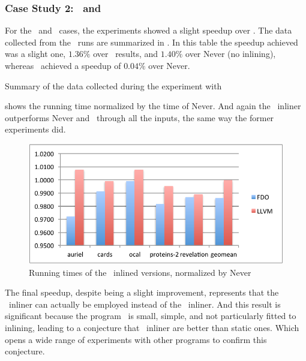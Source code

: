 \subsubsection{Case Study 2: \bzip\  and \gzip}

For the \bzip\ and \gzip\ cases, the experiments showed a slight speedup over \llvm. The data collected from the \bzip\ runs are summarized in . In this table the speedup achieved was a slight one, $1.36 \%$ over \llvm\ results, and $1.40 \%$ over Never (no inlining), whereas \llvm\ achieved a speedup of $0.04 \%$ over Never.

\begin{table}
  \centering
  \begin{tiny}
  
  \end{tiny}
  \caption{Summary of the data collected during the experiment with \bzip}
  \label{tab:speedupb}
\end{table}

 shows the running time normalized by the time of Never. And again the \FDI\ inliner outperforms Never and \llvm\ through all the inputs, the same way the former experiments did. %

\begin{figure}
  \centering
  \includegraphics[width=1.00\linewidth]{Figures/speedupb}
  \caption{Running times of the \bzip\ inlined versions, normalized by Never}
  \label{fig:speedup}
\end{figure}

The final speedup, despite being a slight improvement, represents that the \FDI\ inliner can actually be employed instead of the \llvm\ inliner. And this result is significant because the program \bzip\ is small, simple, and not particularly fitted to inlining, leading to a conjecture that \FDI\ inliner are better than static ones. Which opens a wide range of experiments with other programs to confirm this conjecture.

